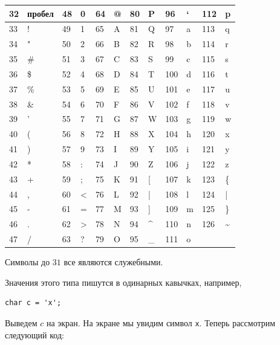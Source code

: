 \documentclass{article}
\begin{document}
	\begin{table}[H]
		\centering
		\begin{tabularx}{\textwidth}{|X|X||X|X||X|X||X|X||X|X||X|X|}
			\hline
			32 & пробел & 48 & 0 & 64 & @ & 80 & P & 96 & ` & 112 & p\\
			\hline
			33 & ! & 49 & 1 & 65 & A & 81 & Q & 97 & a & 113 & q\\
			\hline
			34 & " & 50 & 2 & 66 & B & 82 & R & 98 & b & 114 & r\\
			\hline
			35 & \# & 51 & 3 & 67 & C & 83 & S & 99 & c & 115 & s\\
			\hline
			36 & \$ & 52 & 4 & 68 & D & 84 & T & 100 & d & 116 & t\\
			\hline
			37 & \% & 53 & 5 & 69 & E & 85 & U & 101 & e & 117 & u\\
			\hline
			38 & \& & 54 & 6 & 70 & F & 86 & V & 102 & f & 118 & v\\
			\hline
			39 & ' & 55 & 7 & 71 & G & 87 & W & 103 & g & 119 & w\\
			\hline
			40 & ( & 56 & 8 & 72 & H & 88 & X & 104 & h & 120 & x\\
			\hline
			41 & ) & 57 & 9 & 73 & I & 89 & Y & 105 & i & 121 & y\\
			\hline
			42 & * & 58 & : & 74 & J & 90 & Z & 106 & j & 122 & z\\
			\hline
			43 & + & 59 & ; & 75 & K & 91 & [ & 107 & k & 123 & \{\\
			\hline
			44 & , & 60 & < & 76 & L & 92 & | & 108 & l & 124 & |\\
			\hline
			45 & - & 61 & = & 77 & M & 93 & ] & 109 & m & 125 & \}\\
			\hline
			46 & . & 62 & > & 78 & N & 94 & \textasciicircum & 110 & n & 126 & \textasciitilde\\
			\hline
			47 & / & 63 & ? & 79 & O & 95 & \_ & 111 & o & & \\
			\hline
		\end{tabularx}
	\end{table}
	
	Символы до \textnumero$31$ все являются служебными.
	
	Значения этого типа пишутся в одинарных кавычках, например,
	
	\begin{lstlisting}
char c = 'x';
	\end{lstlisting}
	
	Выведем $c$ на экран. На экране мы увидим символ \texttt{x}. Теперь рассмотрим следующий код:
	
\end{document}
